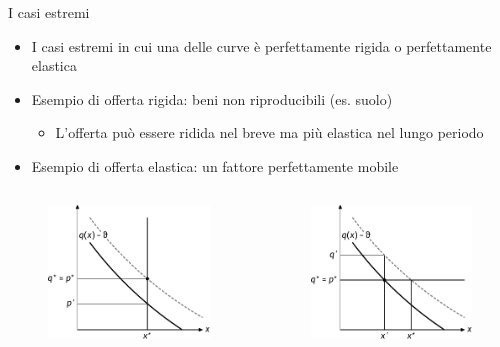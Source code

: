 \documentclass[aspectratio=64,11pt]{beamer}
\begin{document}
\begin{frame}{I casi estremi}
\begin{itemize}
\item I casi estremi in cui una delle curve è perfettamente rigida o perfettamente elastica
\item Esempio di offerta rigida: beni non riproducibili (es. suolo)
\begin{itemize}
\item L'offerta può essere ridida nel breve ma più elastica nel lungo periodo
\end{itemize}
\item Esempio di offerta elastica: un fattore perfettamente mobile
\end{itemize}

\begin{columns}
\begin{column}{.5\columnwidth}
\begin{figure}[htbp]
\centering
\includegraphics[width=.8\textwidth]{./figure/incidenza-7.pdf}
\end{figure}
\end{column}

\begin{column}{.5\columnwidth}
\begin{figure}[htbp]
\centering
\includegraphics[width=.8\textwidth]{./figure/incidenza-8.pdf}
\end{figure}
\end{column}
\end{columns}
\end{frame}
\end{document}

